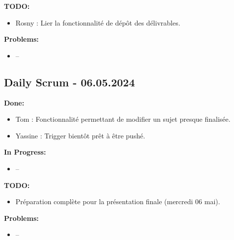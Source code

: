 \documentclass[11pt]{article}
\begin{document}
\textbf{TODO:}
\begin{itemize}
  \item Rosny : Lier la fonctionnalité de dépôt des délivrables.
\end{itemize}

\textbf{Problems:}
\begin{itemize}
  \item -- 
\end{itemize}











\subsection*{{\color{navy}Daily Scrum - 06.05.2024}}

\textbf{Done:}
\begin{itemize}
  \item Tom : Fonctionnalité permettant de modifier un sujet presque finalisée.
  \item Yassine : Trigger bientôt prêt à être pushé.
\end{itemize}

\textbf{In Progress:}
\begin{itemize}
  \item -- 
\end{itemize}

\textbf{TODO:}
\begin{itemize}
  \item Préparation complète pour la présentation finale (mercredi 06 mai).
\end{itemize}

\textbf{Problems:}
\begin{itemize}
  \item -- 
\end{itemize}
\end{document}

